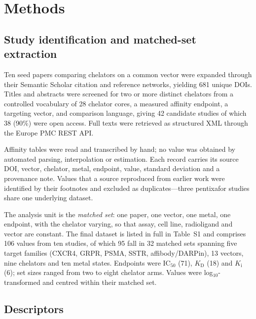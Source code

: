 
\section{Methods}

\subsection{Study identification and matched-set extraction}

Ten seed papers comparing chelators on a common vector were expanded through their Semantic Scholar citation and reference networks, yielding 681 unique DOIs. Titles and abstracts were screened for two or more distinct chelators from a controlled vocabulary of 28 chelator cores, a measured affinity endpoint, a targeting vector, and comparison language, giving 42 candidate studies of which 38 (90\%) were open access. Full texts were retrieved as structured XML through the Europe PMC REST API.

Affinity tables were read and transcribed by hand; no value was obtained by automated parsing, interpolation or estimation. Each record carries its source DOI, vector, chelator, metal, endpoint, value, standard deviation and a provenance note. Values that a source reproduced from earlier work were identified by their footnotes and excluded as duplicates---three pentixafor studies\cite{Poschenrieder2016a,Poschenrieder2016b,Poschenrieder2017} share one underlying dataset.

The analysis unit is the \emph{matched set}: one paper, one vector, one metal, one endpoint, with the chelator varying, so that assay, cell line, radioligand and vector are constant. The final dataset is listed in full in Table~S1 and comprises 106 values from ten studies,\cite{Poschenrieder2016a,Poschenrieder2017,Mitran2019,Fischer2025,Weineisen2014,Sinnes2020,Basaco2024a,Basaco2024b,Rinne2019,Rinne2020} of which 95 fall in 32 matched sets spanning five target families (CXCR4, GRPR, PSMA, SSTR, affibody/DARPin), 13 vectors, nine chelators and ten metal states. Endpoints were IC$_{50}$ (71), $K_\text{D}$ (18) and $K_\text{i}$ (6); set sizes ranged from two to eight chelator arms. Values were log$_{10}$-transformed and centred within their matched set.

\subsection{Descriptors}

